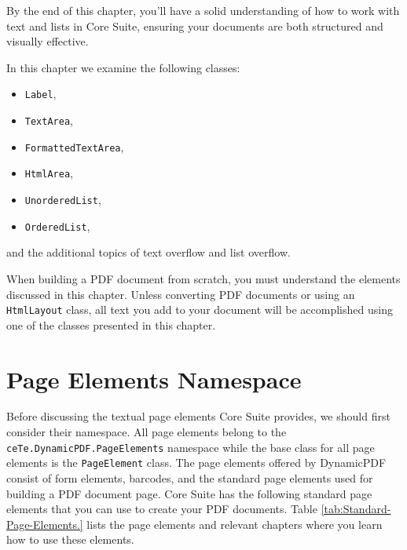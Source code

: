 \documentclass[american,letterpaper]{tufte-book}
\numberwithin{equation}{section}
\numberwithin{figure}{section}
\begin{document}
By the end of this chapter, you'll have a solid understanding of how to work with text and lists in Core Suite, ensuring your documents are both structured and visually effective.

In this chapter we examine the following classes:
\begin{itemize}
\item \texttt{Label},
\item \texttt{TextArea},
\item \texttt{FormattedTextArea},
\item \texttt{HtmlArea},
\item \texttt{UnorderedList},
\item \texttt{OrderedList},
\end{itemize}
and the additional topics of text overflow and list overflow.

When building a PDF document from scratch, you must understand the
elements discussed in this chapter. Unless converting PDF documents
or using an \texttt{HtmlLayout} class, all text you add to your document
will be accomplished using one of the classes presented in this chapter. 

\section{Page Elements Namespace}

Before discussing the textual page elements Core Suite provides, we
should first consider their namespace. All page elements belong to
the \texttt{ceTe.DynamicPDF.PageElements} namespace while the base
class for all page elements is the \texttt{PageElement} class. The
page elements offered by DynamicPDF consist of form elements, barcodes,
and the standard page elements used for building a PDF document page.
Core Suite has the following standard page elements that you can
use to create your PDF documents. Table \ref{tab:Standard-Page-Elements.}
lists the page elements and relevant chapters where you learn how
to use these elements.
\end{document}
